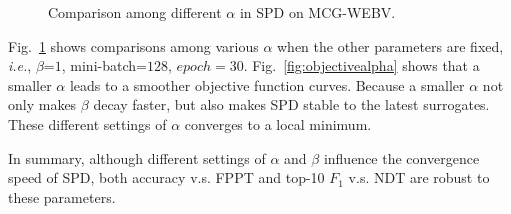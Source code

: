 \documentclass[runningheads]{llncs}
\begin{document}
\begin{figure}[t!]
\centering
\begin{minipage}{1.0\textwidth}
\caption{Comparison among different $\alpha$ in SPD on MCG-WEBV.}
\label{fig:differentalpha}
\end{minipage}
\end{figure}

Fig.~\ref{fig:differentalpha} shows comparisons among various $\alpha$ when the other parameters are fixed, \emph{i.e.}, $\beta$=$1$, mini-batch=$128$, $epoch=30$. Fig.~\ref{fig:objectivealpha} shows that a smaller $\alpha$ leads to a smoother objective function curves. Because a smaller $\alpha$ not only makes $\beta$ decay faster, but also makes SPD stable to the latest surrogates. These different settings of $\alpha$ converges to a local minimum.

In summary, although different settings of $\alpha$ and $\beta$ influence the convergence speed of SPD, both accuracy v.s. FPPT and top-10 $F_1$ v.s. NDT are robust to these parameters.
\end{document}
